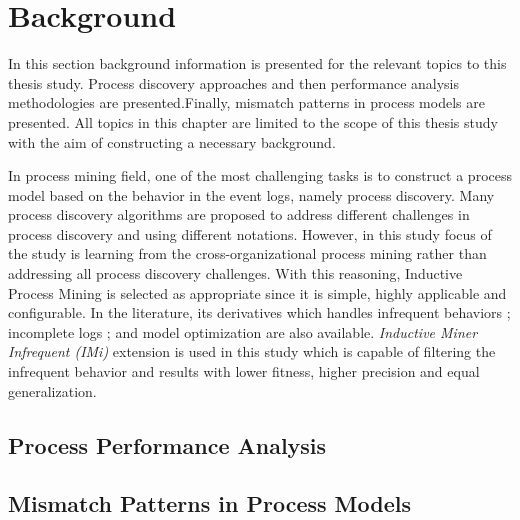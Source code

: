 \section{Background}
\label{sec:background}

In this section background information is presented for the relevant topics to this thesis study. Process discovery approaches and then performance analysis methodologies are presented.Finally, mismatch patterns in process models are presented. All topics in this chapter are limited to the scope of this thesis study with the aim of constructing a necessary background.

In process mining field, one of the most challenging tasks is to construct a process model based on the behavior in the event logs, namely process discovery. Many process discovery algorithms are proposed to address different challenges in process discovery and using different notations. However, in this study focus of the study is learning from the cross-organizational process mining rather than addressing all process discovery challenges. With this reasoning, Inductive Process Mining \cite{leemans2013discovering} is selected as appropriate since it is simple, highly applicable and configurable. In the literature, its derivatives which handles infrequent behaviors \cite{leemans2014discoveringinfrequent}; incomplete logs \cite{leemans2014discoveringincomplete}; and model optimization \cite{weidlich2012profiles} are also available. \textit{Inductive Miner Infrequent (IMi)} \cite{leemans2014discoveringinfrequent} extension is used in this study which is capable of filtering the infrequent behavior and results with lower fitness, higher precision and equal generalization.

\subsection{Process Performance Analysis}
\label{subsec:process-performance-analysis}

\subsection{Mismatch Patterns in Process Models}
\label{subsec:mismatch-patterns-in-process-models}
